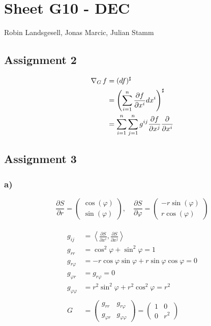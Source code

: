 \documentclass{article}
\begin{document}
\section*{Sheet G10 - DEC}
Robin Landsgesell, Jonas Marcic, Julian Stamm

\subsection*{Assignment 2}
\begin{align*}
	\operatorname{\nabla}_Gf &= (df)^\sharp\\
	&= \left(\sum_{i=1}^n \frac{\partial f}{\partial x^i} dx^i\right)^\sharp\\
	&= \sum_{i=1}^n\sum_{j=1}^n g^{ij} \frac{\partial f}{\partial x^j} \frac{\partial}{\partial x^i}\\
\end{align*}

\subsection*{Assignment 3}

\subsubsection*{a)}
\begin{equation*}
	\frac{\partial S}{\partial r} = \begin{pmatrix}
		\cos(\varphi)\\
		\sin(\varphi)	
		\end{pmatrix},\quad
	\frac{\partial S}{\partial \varphi} = \begin{pmatrix}
		-r\sin(\varphi)\\
		r\cos(\varphi)	
		\end{pmatrix}
\end{equation*}\\
\begin{align*}
	g_{ij} &= \left\langle \frac{\partial S}{\partial x^i}, \frac{\partial S}{\partial x^j} \right\rangle\\
	g_{rr} &= \cos^2\varphi + \sin^2\varphi = 1\\
	g_{r\varphi} &= -r\cos\varphi\sin\varphi + r\sin\varphi\cos\varphi = 0\\
	g_{\varphi r} &= g_{r\varphi} = 0\\
	g_{\varphi \varphi} &= r^2\sin^2\varphi + r^2\cos^2\varphi = r^2\\
	\\
	G &= \begin{pmatrix}
		g_{rr} & g_{r\varphi}\\
		g_{\varphi r} & g_{\varphi \varphi}
		\end{pmatrix} = \begin{pmatrix}
		1 & 0\\
		0 & r^2
		\end{pmatrix}
\end{align*}
\end{document}

